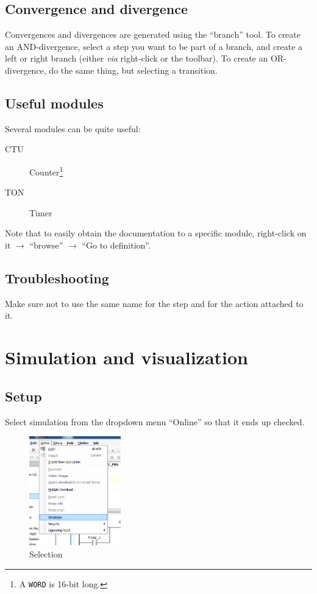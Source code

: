 \documentclass[10pt,a4paper]{article}
\begin{document}
\subsection{Convergence and divergence}
Convergences and divergences are generated using the ``branch'' tool.
To create an AND-divergence, select a step you want to be part of a branch, and create a left or right branch (either \textit{via} right-click or the toolbar).
To create an OR-divergence, do the same thing, but selecting a transition.

\subsection{Useful modules}
Several modules can be quite useful:
\begin{description}
  \item[CTU] Counter\footnote{A \texttt{WORD} is 16-bit long.}
  \item[TON] Timer
\end{description}

Note that to easily obtain the documentation to a specific module, right-click on it $\rightarrow$ ``browse'' $\rightarrow$ ``Go to definition''.

\subsection{Troubleshooting}
Make sure not to use the same name for the step and for the action attached to it.




\section{Simulation and visualization}
\subsection{Setup}
Select simulation from the dropdown menu ``Online'' so that it ends up checked.

\begin{figure}[h!]
	\begin{center}
		\includegraphics[width=150px]{img9.png}
	\end{center}
\caption{Selection}
\label{fig:simu}
\end{figure}
\end{document}

